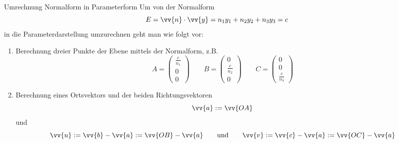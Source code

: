 \begin{frame}{Umrechnung Normalform in Parameterform}
	Um von der Normalform
	\[
	E = \vv{n} \cdot \vv{y} = n_1 y_1 + n_2 y_2 + n_3 y_3 = c
	\]
	in die Parameterdarstellung umzurechnen geht man wie folgt vor:
	\begin{enumerate}
		\item Berechnung dreier Punkte der Ebene mittels der Normalform, z.B.
		\[
		A = \begin{pmatrix}
		\frac{c}{n_1} \\0 \\0
		\end{pmatrix} \qquad B = \begin{pmatrix}
		0\\ \frac{c}{n_2} \\ 0
		\end{pmatrix} \qquad C = \begin{pmatrix}
		0\\ 0 \\ \frac{c}{n_3}
		\end{pmatrix}
		\]
		\item Berechnung eines Ortsvektors und der beiden Richtungsvektoren
		\[
		\vv{a} := \vv{OA}\]
		und
		\[
		\vv{u} := \vv{b} - \vv{a} := \vv{OB} - \vv{a} \qquad \mbox{und}\qquad \vv{v} := \vv{c} - \vv{a} := \vv{OC} - \vv{a}
		\]
	\end{enumerate}
\end{frame}

